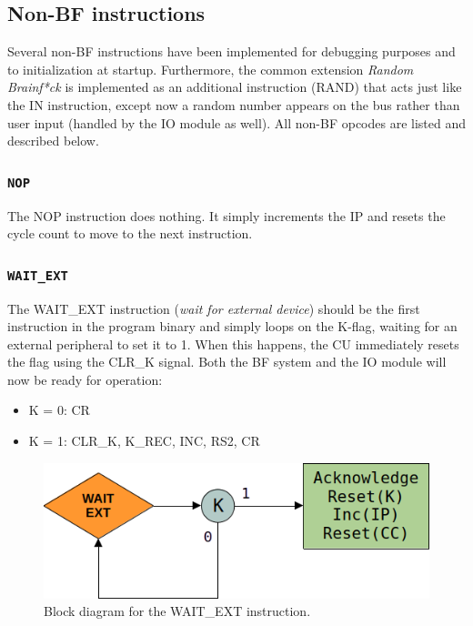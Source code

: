 \documentclass{article}
\begin{document}
\subsection{Non-BF instructions} \label{seq:sequences:nonbf}
Several non-BF instructions have been implemented for debugging purposes and to initialization at startup. Furthermore, the common extension \emph{Random Brainf*ck} \cite{esolangs-rbf} is implemented as an additional instruction (RAND) that acts just like the IN instruction, except now a random number appears on the bus rather than user input (handled by the IO module as well). All non-BF opcodes are listed and described below.

\subsubsection{\texttt{NOP}}
The NOP instruction does nothing. It simply increments the IP and resets the cycle count to move to the next instruction.

\subsubsection{\texttt{WAIT\_EXT}}
The WAIT\_EXT instruction (\emph{wait for external device}) should be the first instruction in the program binary and simply loops on the K-flag, waiting for an external peripheral to set it to 1. When this happens, the CU immediately resets the flag using the CLR\_K signal. Both the BF system and the IO module will now be ready for operation:
\begin{itemize}
 \item K = 0: CR
 \item K = 1: CLR\_K, K\_REC, INC, RS2, CR
\end{itemize}

\begin{figure}[H]
  \centering
  \includegraphics[scale=0.4]{img/waitextalg}
  \caption{Block diagram for the WAIT\_EXT instruction.}
  \label{fig:rightalg}
\end{figure}
\end{document}
